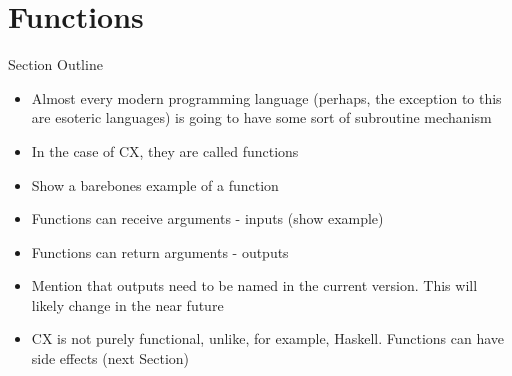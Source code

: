 \documentclass[11pt,fleqn,openany]{book} %
\begin{document}



\chapter{Functions}
\label{chapter:functions}

\begin{remark}
Section Outline
    \begin{itemize}
    	\item Almost every modern programming language (perhaps, the exception to this are esoteric languages) is going to have some sort of subroutine mechanism
        \item In the case of CX, they are called functions
        \item Show a barebones example of a function
        \item Functions can receive arguments - inputs (show example)
        \item Functions can return arguments - outputs
        \item Mention that outputs need to be named in the current version. This will likely change in the near future
        \item CX is not purely functional, unlike, for example, Haskell. Functions can have side effects (next Section)
    \end{itemize}
\end{remark}
\end{document}
